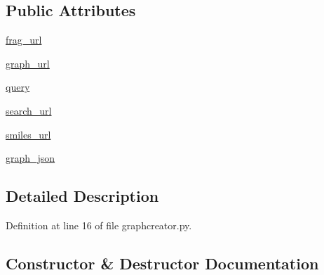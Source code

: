 \subsection*{Public Attributes}
\begin{DoxyCompactItemize}
\item 
\hyperlink{classfragalysis__api_1_1xcanalyser_1_1graphcreator_1_1_graph_request_ac1d452fb3f9d6e80ba3a31e02145d043}{frag\+\_\+url}
\item 
\hyperlink{classfragalysis__api_1_1xcanalyser_1_1graphcreator_1_1_graph_request_a8c195076876c81b0beada67b8757caf2}{graph\+\_\+url}
\item 
\hyperlink{classfragalysis__api_1_1xcanalyser_1_1graphcreator_1_1_graph_request_a6f74c9499e8e158b9416880b3c7133a6}{query}
\item 
\hyperlink{classfragalysis__api_1_1xcanalyser_1_1graphcreator_1_1_graph_request_a212573c4bde168c0fd5563124284e569}{search\+\_\+url}
\item 
\hyperlink{classfragalysis__api_1_1xcanalyser_1_1graphcreator_1_1_graph_request_a9659e3db8ca34a5f3bb7c3186df87fe0}{smiles\+\_\+url}
\item 
\hyperlink{classfragalysis__api_1_1xcanalyser_1_1graphcreator_1_1_graph_request_a564113897c119dfd6dcd066b12d1f481}{graph\+\_\+json}
\end{DoxyCompactItemize}


\subsection{Detailed Description}


Definition at line 16 of file graphcreator.\+py.



\subsection{Constructor \& Destructor Documentation}
\mbox{\label{classfragalysis__api_1_1xcanalyser_1_1graphcreator_1_1_graph_request_ac2cce029ca7a29dab5625823e2eb92c2}} 
